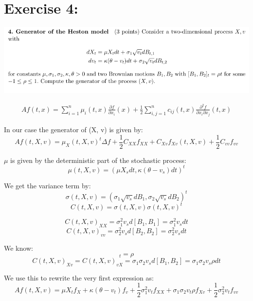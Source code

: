 \documentclass[document.tex]{subfiles}
\begin{document}
\section*{Exercise 4:}


\includegraphics[width=\textwidth]{ex4.png}


\begin{align*}
Af(t,x)=\sum_{i=1}^{n} \mu_i(t,x) \frac{\partial f}{\partial x_i} (x) + \frac{1}{2} \sum_{i,j=1}^n c_{ij} (t,x) 
\frac{\partial^2 f}{\partial x_i \partial x_j} (t,x)
\end{align*}

In our case the generator of (X, v) is given by:
\begin{equation}
Af(t, X, v) = \mu_X(t, X, v)^t \Delta f + \frac{1}{2} C_{XX} f_{XX} + C_{Xv} f_{Xv}(t, X, v) + \frac{1}{2} C_{vv} f_{vv}
\end{equation}

$\mu$ is given by the deterministic part of the stochastic process:
\begin{equation}
\mu(t, X, v) = (\mu X_s dt, \kappa (\theta - v_s) dt)^t
\end{equation}


We get the variance term by:
\begin{equation}
\sigma(t, X, v) = (\sigma_1 \sqrt{v_s} d B_1, \sigma_2 \sqrt{v_s} d B_2)^t
\end{equation}
\begin{equation}
C(t, X, v) = \sigma(t, X, v) \sigma(t, X, v)^t
\end{equation}

\begin{equation}
C(t, X, v)_{XX} = \sigma_1^2 v_s d [B_1, B_1] = \sigma_1^2 v_s d t
\end{equation}
\begin{equation}
C(t, X, v)_{vv} = \sigma_2^2 v_s d [B_2, B_2] = \sigma_2^2 v_s d t
\end{equation}

We know:
\begin{equation}
[B_1, B_2]_t = \rho
\end{equation}
\begin{equation}
C(t, X, v)_{Xv} = C(t, X, v)_{vX} = \sigma_1 \sigma_2 v_s d [B_1, B_2] = \sigma_1 \sigma_2 v_s \rho d t
\end{equation}

We use this to rewrite the very first expression as:
\begin{equation}
Af(t, X, v) = \mu X_t f_X + \kappa (\theta - v_t) f_v + \frac{1}{2} \sigma_1^2 v_t f_{XX} + \sigma_1 \sigma_2 v_t \rho f_{Xv} + \frac{1}{2} \sigma_2^2 v_t f_{vv}
\end{equation}
\end{document}
